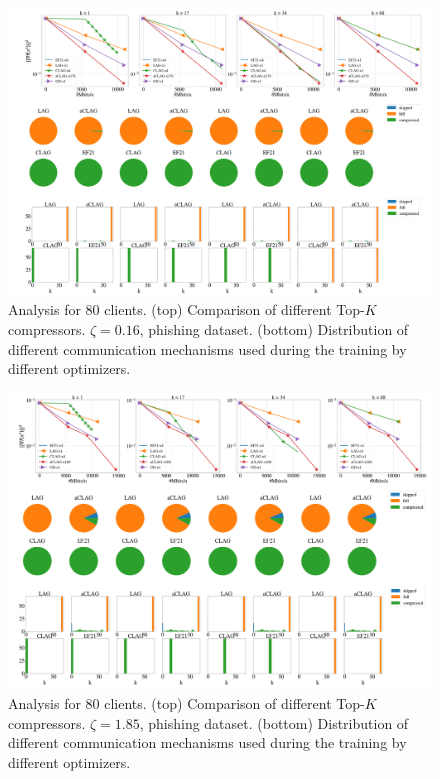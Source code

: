 \documentclass[nohyperref]{article}
\theoremstyle{plain}
\theoremstyle{definition}
\theoremstyle{remark}
\begin{document}
\begin{figure}[!h]
	\centering
	\includegraphics[width=\textwidth]{plots/adaptive/new_4.png}
	\caption{Analysis for 80 clients. (top) Comparison of different  Top-$K$ compressors. $\zeta = 0.16$, phishing dataset. (bottom) Distribution  of different communication mechanisms used during the training by different optimizers.}
	\label{fig:anna-100-nodes-grads_main}
\end{figure}

\begin{figure}[!h]
	\centering
	\includegraphics[width=\textwidth]{plots/adaptive/new_5.png}
	\caption{Analysis for 80 clients. (top) Comparison of different  Top-$K$ compressors. $\zeta = 1.85$, phishing dataset. (bottom) Distribution  of different communication mechanisms used during the training by different optimizers.}
	\label{fig:anna-100-nodes-grads_main}
\end{figure}
\end{document}
